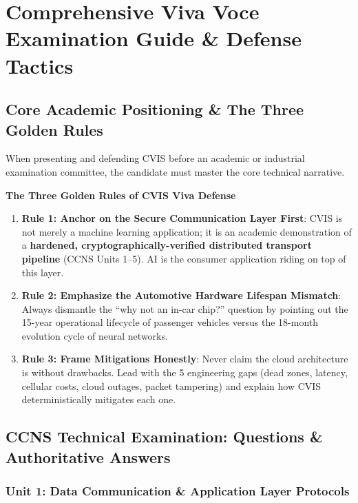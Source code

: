 \documentclass[12pt,a4paper]{report}
\newenvironment{ccnsbox}[1]{%
  \begin{mdframed}[backgroundcolor=cvislightbg,
    linecolor=cvisblue,linewidth=1.5pt,
    innerleftmargin=10pt,innerrightmargin=10pt,
    innertopmargin=6pt,innerbottommargin=6pt]
  \textbf{\color{cvisblue}#1}\par\smallskip}
  {\end{mdframed}}
\begin{document}
\chapter{Comprehensive Viva Voce Examination Guide \& Defense Tactics}

\section{Core Academic Positioning \& The Three Golden Rules}

When presenting and defending CVIS before an academic or industrial examination committee, the candidate must master the core technical narrative.

\begin{ccnsbox}{The Three Golden Rules of CVIS Viva Defense}
\begin{enumerate}[leftmargin=*,nosep]
  \item \textbf{Rule 1: Anchor on the Secure Communication Layer First}: CVIS is not merely a machine learning application; it is an academic demonstration of a \textbf{hardened, cryptographically-verified distributed transport pipeline} (CCNS Units 1--5). AI is the consumer application riding on top of this layer.
  \item \textbf{Rule 2: Emphasize the Automotive Hardware Lifespan Mismatch}: Always dismantle the ``why not an in-car chip?'' question by pointing out the 15-year operational lifecycle of passenger vehicles versus the 18-month evolution cycle of neural networks.
  \item \textbf{Rule 3: Frame Mitigations Honestly}: Never claim the cloud architecture is without drawbacks. Lead with the 5 engineering gaps (dead zones, latency, cellular costs, cloud outages, packet tampering) and explain how CVIS deterministically mitigates each one.
\end{enumerate}
\end{ccnsbox}

\section{CCNS Technical Examination: Questions \& Authoritative Answers}

\subsection{Unit 1: Data Communication \& Application Layer Protocols}
\end{document}
